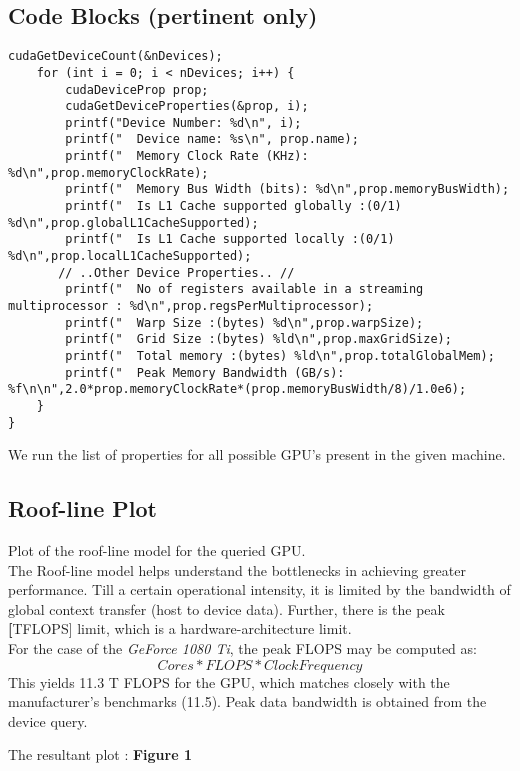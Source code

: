 \subsection {Code Blocks (pertinent only)}
\begin{lstlisting}
cudaGetDeviceCount(&nDevices);
    for (int i = 0; i < nDevices; i++) {
        cudaDeviceProp prop;
        cudaGetDeviceProperties(&prop, i);
        printf("Device Number: %d\n", i);
        printf("  Device name: %s\n", prop.name);
        printf("  Memory Clock Rate (KHz): %d\n",prop.memoryClockRate);
        printf("  Memory Bus Width (bits): %d\n",prop.memoryBusWidth);
        printf("  Is L1 Cache supported globally :(0/1) %d\n",prop.globalL1CacheSupported);
        printf("  Is L1 Cache supported locally :(0/1) %d\n",prop.localL1CacheSupported);
       // ..Other Device Properties.. //
        printf("  No of registers available in a streaming multiprocessor : %d\n",prop.regsPerMultiprocessor);
        printf("  Warp Size :(bytes) %d\n",prop.warpSize);
        printf("  Grid Size :(bytes) %ld\n",prop.maxGridSize);
        printf("  Total memory :(bytes) %ld\n",prop.totalGlobalMem);
        printf("  Peak Memory Bandwidth (GB/s): %f\n\n",2.0*prop.memoryClockRate*(prop.memoryBusWidth/8)/1.0e6);
    }
}
\end{lstlisting}

We run the list of properties for all possible GPU's present in the given machine.

\bigskip
\subsection {Roof-line Plot}
\noindent Plot of the roof-line model for the queried GPU.\\

The Roof-line model helps understand the bottlenecks in achieving greater performance. Till a certain operational intensity, it is limited by the bandwidth of global context transfer (host to device data). Further, there is the peak \textbf[TFLOPS] limit, which is a hardware-architecture limit.\\

For the case of the \textit{GeForce 1080 Ti}, the peak FLOPS may be computed as:
$$ Cores * FLOPS *Clock Frequency$$
This yields 11.3 T FLOPS for the GPU, which matches closely with the manufacturer's benchmarks (11.5). Peak data bandwidth is obtained from the device query.

The resultant plot : \textbf{Figure 1}

